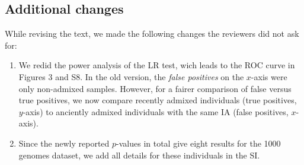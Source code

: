 \documentclass[12pt]{article}
\theoremstyle{definition}
\begin{document}
\color{blue}
\subsection*{Additional changes}
While revising the text, we made the following changes the reviewers did not ask for:
\begin{enumerate}
    \item We redid the power analysis of the LR test, wich leads to the ROC curve in Figures 3 and S8. In the old version, the {\em false positives} on the $x$-axis were only non-admixed samples. However, for a fairer comparison of false versus true positives, we now compare recently admixed individuals (true positives, $y$-axis) to anciently admixed individuals with the same IA (false positives, $x$-axis).
\item Since the newly reported $p$-values in total give eight results for the 1000 genomes dataset, we add all details for these individuals in the SI.
\end{enumerate}
\end{document}
